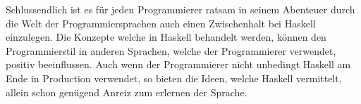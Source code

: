 \documentclass{hhuarticle}
\theoremstyle{definition}
\theoremstyle{theorem}
\begin{document}
  Schlussendlich ist es für jeden Programmierer ratsam in seinem
  Abenteuer durch die Welt der Programmiersprachen auch einen Zwischenhalt
  bei Haskell einzulegen. Die Konzepte welche in Haskell behandelt
  werden, können den Programmierstil in anderen Sprachen, welche
  der Programmierer verwendet, positiv beeinflussen.
  Auch wenn der Programmierer nicht unbedingt Haskell am Ende in
  Production verwendet, so bieten die Ideen, welche Haskell vermittelt,
  allein schon genügend Anreiz zum erlernen der Sprache.







\end{document}
